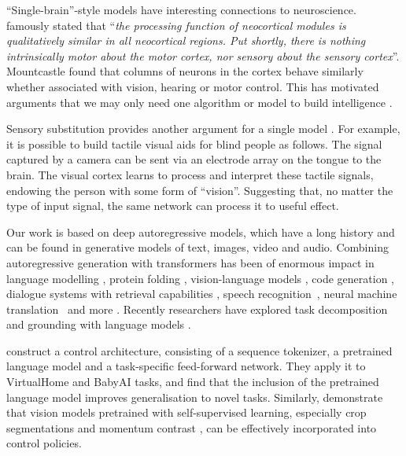 \documentclass[10pt]{article} \usepackage[accepted]{tmlr}
\begin{document}
``Single-brain''-style models have interesting connections to neuroscience.
\cite{mountcastle1978organizing} famously stated that ``\emph{the processing function of neocortical modules is qualitatively similar in all neocortical regions.
Put shortly, there is nothing intrinsically motor about the motor cortex, nor sensory about the sensory cortex}''.
Mountcastle found that columns of neurons in the cortex behave similarly whether associated with vision, hearing or motor control.
This has motivated arguments that we may only need one algorithm or model to build intelligence \citep{hawkins2004intelligence}.

Sensory substitution provides another argument for a single model \citep{bach2003sensory}. For example, it is possible to build tactile visual aids for blind people as follows. The signal captured by a camera can be sent via an electrode array on the tongue to the brain. The visual cortex learns to process and interpret these tactile signals, endowing the person with some form of ``vision''. Suggesting that, no matter the type of input signal, the same network can process it to useful effect.

Our work is based on deep autoregressive models, which have a long history and can be found in generative models of text, images, video and audio. Combining autoregressive generation with transformers \citep{vaswani2017attention,devlin2018bert} has been of enormous impact in language modelling \citep{brown2020language,rae2021scaling}, protein folding \citep{jumper2021highly}, vision-language models \citep{tsimpoukelli2021multimodal, wang2021simvlm,Alayrac2022FlamingoAV}, code generation \citep{chen2021evaluating,li2022competition}, dialogue systems with retrieval capabilities \citep{nakano2021webgpt,thoppilan2022lamda}, speech recognition~\citep{pratap2020massively}, neural machine translation~\citep{johnson2019massively} and more \citep{bommasani2021opportunities}. Recently researchers have explored task decomposition and grounding with language models \citep{huang2022language,ahn2022can}. 

\cite{li2022pre} construct a control architecture, consisting of a sequence tokenizer, a pretrained language model and a task-specific feed-forward network. They apply it to VirtualHome and BabyAI tasks, and find that the inclusion of the pretrained language model improves generalisation to novel tasks. Similarly, \cite{parisi2022unsurprising} demonstrate that vision models pretrained with self-supervised learning, especially crop segmentations and momentum contrast \citep{he2020momentum}, can be effectively incorporated into control policies.
\end{document}
